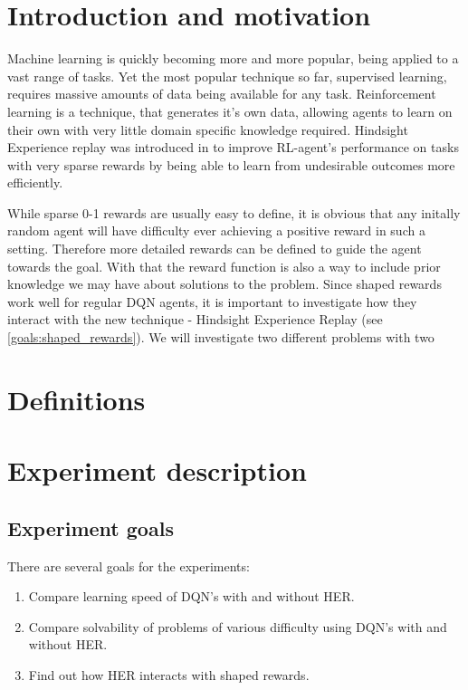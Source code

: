 \section{Introduction and motivation}
Machine learning is quickly becoming more and more popular, being applied to a vast range of tasks. Yet the most popular technique so far, supervised learning, requires massive amounts of data being available for any task. Reinforcement learning is a technique, that generates it's own data, allowing agents to learn on their own with very little domain specific knowledge required.
Hindsight Experience replay was introduced in \parencite{HER_paper} to improve RL-agent's performance on tasks with very sparse rewards by being able to learn from undesirable outcomes more efficiently.

While sparse 0-1 rewards are usually easy to define, it is obvious that any initally random agent will have difficulty ever achieving a positive reward in such a setting. Therefore more detailed rewards can be defined to guide the agent towards the goal. With that the reward function is also a way to include prior knowledge we may have about solutions to the problem. Since shaped rewards work well for regular DQN agents, it is important to investigate how they interact with the new technique - Hindsight Experience Replay (see \ref{goals:shaped_rewards}). We will investigate two different problems with two 
%
%
\section{Definitions}

%
%
\section{Experiment description}
\subsection{Experiment goals \label{section:goals}}
There are several goals for the experiments:
\begin{enumerate}
    \item Compare learning speed of DQN's with and without HER. \label{goals:learning_speed}
    \item Compare solvability of problems of various difficulty using DQN's with and without HER. \label{goals:solvability}
    \item Find out how HER interacts with shaped rewards. \label{goals:shaped_rewards}
\end{enumerate}
